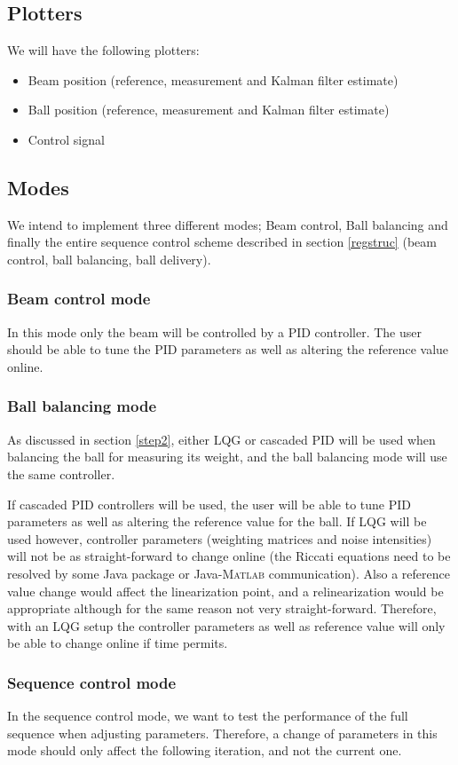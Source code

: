 \documentclass{article}
\begin{document}
\subsection{Plotters}
We will have the following plotters:
\begin{itemize}
\item Beam position (reference, measurement and Kalman filter estimate)
\item Ball position (reference, measurement and Kalman filter estimate)
\item Control signal
\end{itemize}

\subsection{Modes}
We intend to implement three different modes; Beam control, Ball balancing and finally the entire sequence control scheme described in section \ref{regstruc} (beam control, ball balancing, ball delivery).
\subsubsection{Beam control mode}
In this mode only the beam will be controlled by a PID controller. The user should be able to tune the PID parameters as well as altering the reference value online.

\subsubsection{Ball balancing mode}
As discussed in section \ref{step2}, either LQG or cascaded PID will be used when balancing the ball for measuring its weight, and the ball balancing mode will use the same controller.

If cascaded PID controllers will be used, the user will be able to tune PID parameters as well as altering the reference value for the ball. If LQG will be used however, controller parameters (weighting matrices and noise intensities) will not be as straight-forward to change online (the Riccati equations need to be resolved by some Java package or Java-\textsc{Matlab} communication). Also a reference value change would affect the linearization point, and a relinearization would be appropriate although for the same reason not very straight-forward. Therefore, with an LQG setup the controller parameters as well as reference value will only be able to change online if time permits.

\subsubsection{Sequence control mode}
In the sequence control mode, we want to test the performance of the full sequence when adjusting parameters. Therefore, a change of parameters in this mode should only affect the following iteration, and not the current one.
\end{document}
